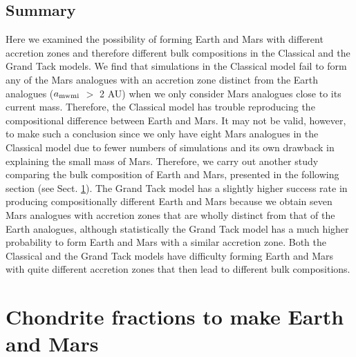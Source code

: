 \documentclass{aa}
\begin{document}
\begin{figure*}

\caption{The total number of Mars analogues in each subset of simulations as a function of the initial number of embryos per simulation (see Table \ref{tb:embryo_no_1}) of the Grand Tack model with equal-mass initial conditions. The results from simulations with Jupiter’s tack location at 1.5 AU and 2 AU are combined.}    

\label{fig:embryos_mars_analog}

\end{figure*}

\subsection{Summary}
\label{subsec:sum_accret_com}
Here we examined the possibility of forming Earth and Mars with different accretion zones and therefore different bulk compositions in the Classical and the Grand Tack models. We find that simulations in the Classical model fail to form any of the Mars analogues with an accretion zone distinct from the Earth analogues ($a_{\rm mwmi}$ $>$ 2 AU) when we only consider Mars analogues close to its current mass. Therefore, the Classical model has trouble reproducing the compositional difference between Earth and Mars. It may not be valid, however, to make such a conclusion since we only have eight Mars analogues in the Classical model due to fewer numbers of simulations and its own drawback in explaining the small mass of Mars. Therefore, we carry out another study comparing the bulk composition of Earth and Mars, presented in the following section (see Sect. \ref{sec:chon_frac}). The Grand Tack model has a slightly higher success rate in producing compositionally different Earth and Mars because we obtain seven Mars analogues with accretion zones that are wholly distinct from that of the Earth analogues, although statistically the Grand Tack model has a much higher probability to form Earth and Mars with a similar accretion zone. Both the Classical and the Grand Tack models have difficulty forming Earth and Mars with quite different accretion zones that then lead to different bulk compositions. 

\section{Chondrite fractions to make Earth and Mars}
\label{sec:chon_frac}
\end{document}
